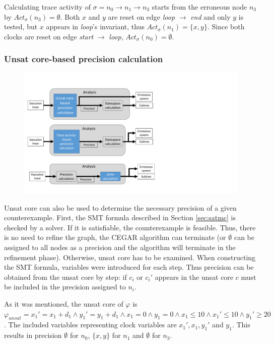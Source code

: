 \begin{runningExample}
	Calculating trace activity of $\sigma= n_0 \to n_1 \to n_3$ starts from the erroneous node $n_3$ by $Act_\sigma(n_3)=\emptyset$. Both $x$ and $y$ are reset on edge \emph{loop} $\to$ \emph{end} and only $y$ is tested, but $x$ appears in \emph{loop}'s invariant, thus $Act_\sigma(n_1)=\{x,y\}$. Since both clocks are reset on edge \emph{start} $\to$ \emph{loop}, $Act_\sigma(n_0)=\emptyset$.
\end{runningExample}

\subsubsection{Unsat core-based precision calculation}

\begin{figure}[h]
	\centering
	\includegraphics[width=\textwidth]{include/figures/modules_ssp_anal_uncore}
\end{figure}


Unsat core can also be used to determine the necessary precision of a given counterexample. First, the SMT formula described in Section \ref{sec:satmc} is checked by a solver. If it is satisfiable, the counterexample is feasible. Thus, there is no need to refine the graph, the CEGAR algorithm can terminate (or $\emptyset$ can be assigned to all nodes as a precision and the algorithm will terminate in the refinement phase). Otherwise, unsat core has to be examined. When constructing the SMT formula, variables were introduced for each step. Thus precision can be obtained from the unsat core by step: if $c_i$ or $c_i'$ appears in the unsat core $c$ must be included in the precision assigned to $n_i$.

\begin{runningExample}
	As it was mentioned, the unsat core of $\varphi$ is $\varphi_{unsat}=x_1'=x_1+d_1 \wedge y_1'=y_1+d_1 \wedge x_1=0 \wedge y_1=0 \wedge x_1 \leq 10 \wedge x_1' \leq 10 \wedge y_1' \geq 20$. The included variables representing clock variables are $x_1',x_1,y_1'$ and $y_1$. This results in precision $\emptyset$ for $n_0$, $\{x,y\}$ for $n_1$ and $\emptyset$ for $n_3$.
\end{runningExample}

